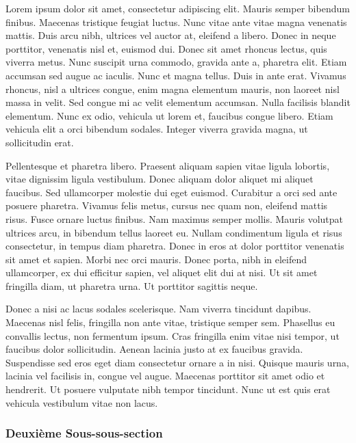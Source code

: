 \documentclass{rapportCS}
\begin{document}
\par Lorem ipsum dolor sit amet, consectetur adipiscing elit. Mauris semper bibendum finibus. Maecenas tristique feugiat luctus. Nunc vitae ante vitae magna venenatis mattis. Duis arcu nibh, ultrices vel auctor at, eleifend a libero. Donec in neque porttitor, venenatis nisl et, euismod dui. Donec sit amet rhoncus lectus, quis viverra metus. Nunc suscipit urna commodo, gravida ante a, pharetra elit. Etiam accumsan sed augue ac iaculis. Nunc et magna tellus. Duis in ante erat. Vivamus rhoncus, nisl a ultrices congue, enim magna elementum mauris, non laoreet nisl massa in velit. Sed congue mi ac velit elementum accumsan. Nulla facilisis blandit elementum. Nunc ex odio, vehicula ut lorem et, faucibus congue libero. Etiam vehicula elit a orci bibendum sodales. Integer viverra gravida magna, ut sollicitudin erat.

\par Pellentesque et pharetra libero. Praesent aliquam sapien vitae ligula lobortis, vitae dignissim ligula vestibulum. Donec aliquam dolor aliquet mi aliquet faucibus. Sed ullamcorper molestie dui eget euismod. Curabitur a orci sed ante posuere pharetra. Vivamus felis metus, cursus nec quam non, eleifend mattis risus. Fusce ornare luctus finibus. Nam maximus semper mollis. Mauris volutpat ultrices arcu, in bibendum tellus laoreet eu. Nullam condimentum ligula et risus consectetur, in tempus diam pharetra. Donec in eros at dolor porttitor venenatis sit amet et sapien. Morbi nec orci mauris. Donec porta, nibh in eleifend ullamcorper, ex dui efficitur sapien, vel aliquet elit dui at nisi. Ut sit amet fringilla diam, ut pharetra urna. Ut porttitor sagittis neque.

\par Donec a nisi ac lacus sodales scelerisque. Nam viverra tincidunt dapibus. Maecenas nisl felis, fringilla non ante vitae, tristique semper sem. Phasellus eu convallis lectus, non fermentum ipsum. Cras fringilla enim vitae nisi tempor, ut faucibus dolor sollicitudin. Aenean lacinia justo at ex faucibus gravida. Suspendisse sed eros eget diam consectetur ornare a in nisi. Quisque mauris urna, lacinia vel facilisis in, congue vel augue. Maecenas porttitor sit amet odio et hendrerit. Ut posuere vulputate nibh tempor tincidunt. Nunc ut est quis erat vehicula vestibulum vitae non lacus.

\subsubsection{Deuxième Sous-sous-section}
\lipsum[1]
\end{document}
